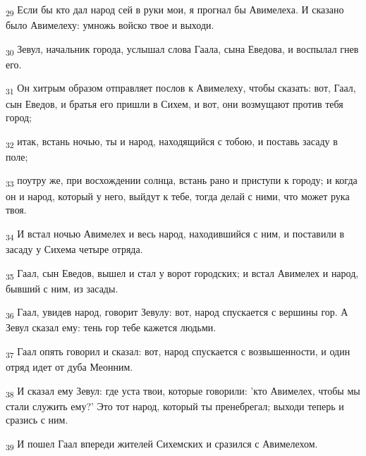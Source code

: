 \begin{tcolorbox}
\textsubscript{29} Если бы кто дал народ сей в руки мои, я прогнал бы Авимелеха. И сказано было Авимелеху: умножь войско твое и выходи.
\end{tcolorbox}
\begin{tcolorbox}
\textsubscript{30} Зевул, начальник города, услышал слова Гаала, сына Еведова, и воспылал гнев его.
\end{tcolorbox}
\begin{tcolorbox}
\textsubscript{31} Он хитрым образом отправляет послов к Авимелеху, чтобы сказать: вот, Гаал, сын Еведов, и братья его пришли в Сихем, и вот, они возмущают против тебя город;
\end{tcolorbox}
\begin{tcolorbox}
\textsubscript{32} итак, встань ночью, ты и народ, находящийся с тобою, и поставь засаду в поле;
\end{tcolorbox}
\begin{tcolorbox}
\textsubscript{33} поутру же, при восхождении солнца, встань рано и приступи к городу; и когда он и народ, который у него, выйдут к тебе, тогда делай с ними, что может рука твоя.
\end{tcolorbox}
\begin{tcolorbox}
\textsubscript{34} И встал ночью Авимелех и весь народ, находившийся с ним, и поставили в засаду у Сихема четыре отряда.
\end{tcolorbox}
\begin{tcolorbox}
\textsubscript{35} Гаал, сын Еведов, вышел и стал у ворот городских; и встал Авимелех и народ, бывший с ним, из засады.
\end{tcolorbox}
\begin{tcolorbox}
\textsubscript{36} Гаал, увидев народ, говорит Зевулу: вот, народ спускается с вершины гор. А Зевул сказал ему: тень гор тебе кажется людьми.
\end{tcolorbox}
\begin{tcolorbox}
\textsubscript{37} Гаал опять говорил и сказал: вот, народ спускается с возвышенности, и один отряд идет от дуба Меонним.
\end{tcolorbox}
\begin{tcolorbox}
\textsubscript{38} И сказал ему Зевул: где уста твои, которые говорили: 'кто Авимелех, чтобы мы стали служить ему?' Это тот народ, который ты пренебрегал; выходи теперь и сразись с ним.
\end{tcolorbox}
\begin{tcolorbox}
\textsubscript{39} И пошел Гаал впереди жителей Сихемских и сразился с Авимелехом.
\end{tcolorbox}
